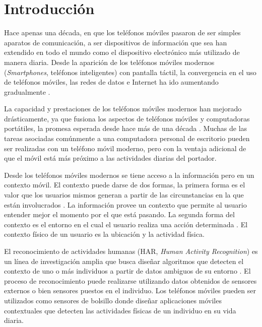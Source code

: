 
\chapter{Introducción}

\label{introduccion}

Hace apenas una década, en que los teléfonos móviles pasaron de ser
simples aparatos de comunicación, a ser dispositivos de información
que sea han extendido en todo el mundo como el dispositivo electrónico
más utilizado de manera diaria. Desde la aparición de los teléfonos
móviles modernos (\emph{Smartphones}, teléfonos inteligentes) con
pantalla táctil, la convergencia en el uso de teléfonos móviles, las
redes de datos e Internet ha ido aumentando gradualmente \cite{fling2009mobile}.

La capacidad y prestaciones de los teléfonos móviles modernos han
mejorado drásticamente, ya que fusiona los aspectos de teléfonos móviles
y computadoras portátiles, la promesa esperada desde hace más de una
década \cite{Tanenbaum2010}. Muchas de las tareas asociadas comúnmente
a una computadora personal de escritorio pueden ser realizadas con
un teléfono móvil moderno, pero con la ventaja adicional de que el
móvil está más próximo a las actividades diarias del portador.

Desde los teléfonos móviles modernos se tiene acceso a la información
pero en un contexto móvil. El contexto puede darse de dos formas,
la primera forma es el valor que los usuarios mismos generan a partir
de las circunstancias en la que están involucrados \cite{fling2009mobile}.
La información provee un contexto que permite al usuario entender
mejor el momento por el que está pasando. La segunda forma del contexto
es el entorno en el cual el usuario realiza una acción determinada
\cite{fling2009mobile}. El contexto físico de un usuario es la ubicación
y la actividad física. 

El reconocimiento de actividades humanas (HAR,
\emph{Human Activity Recognition}) es un línea de investigación amplia
que busca diseñar algoritmos que detecten el contexto de uno o más
individuos a partir de datos ambiguos de su entorno \cite{Bao2004}.
El proceso de reconocimiento puede realizarse utilizando datos obtenidos
de sensores externos o bien sensores puestos en el individuo. Los
teléfonos móviles pueden ser utilizados como sensores de bolsillo
donde diseñar aplicaciones móviles contextuales que detecten las actividades
físicas de un individuo en su vida diaria\cite{LaraLabrador2013}. 

